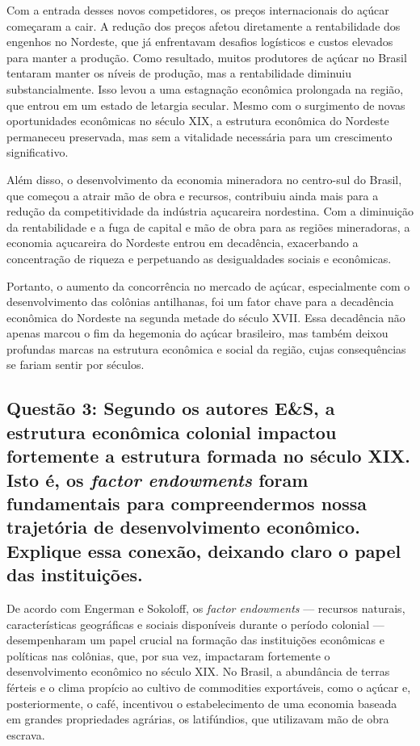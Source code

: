 \documentclass[a4paper,12pt]{article}[abntex2]
\begin{document}
Com a entrada desses novos competidores, os preços internacionais do açúcar começaram a cair. A redução dos preços afetou diretamente a rentabilidade dos engenhos no Nordeste, que já enfrentavam desafios logísticos e custos elevados para manter a produção. Como resultado, muitos produtores de açúcar no Brasil tentaram manter os níveis de produção, mas a rentabilidade diminuiu substancialmente. Isso levou a uma estagnação econômica prolongada na região, que entrou em um estado de letargia secular. Mesmo com o surgimento de novas oportunidades econômicas no século XIX, a estrutura econômica do Nordeste permaneceu preservada, mas sem a vitalidade necessária para um crescimento significativo.

Além disso, o desenvolvimento da economia mineradora no centro-sul do Brasil, que começou a atrair mão de obra e recursos, contribuiu ainda mais para a redução da competitividade da indústria açucareira nordestina. Com a diminuição da rentabilidade e a fuga de capital e mão de obra para as regiões mineradoras, a economia açucareira do Nordeste entrou em decadência, exacerbando a concentração de riqueza e perpetuando as desigualdades sociais e econômicas.

Portanto, o aumento da concorrência no mercado de açúcar, especialmente com o desenvolvimento das colônias antilhanas, foi um fator chave para a decadência econômica do Nordeste na segunda metade do século XVII. Essa decadência não apenas marcou o fim da hegemonia do açúcar brasileiro, mas também deixou profundas marcas na estrutura econômica e social da região, cujas consequências se fariam sentir por séculos.

\subsection{\textbf{Questão 3: Segundo os autores E\&S, a estrutura econômica colonial impactou fortemente a estrutura formada no século XIX. Isto é, os \textit{factor endowments} foram fundamentais para compreendermos nossa trajetória de desenvolvimento econômico. Explique essa conexão, deixando claro o papel das instituições.}}

De acordo com Engerman e Sokoloff, os \textit{factor endowments} — recursos naturais, características geográficas e sociais disponíveis durante o período colonial — desempenharam um papel crucial na formação das instituições econômicas e políticas nas colônias, que, por sua vez, impactaram fortemente o desenvolvimento econômico no século XIX. No Brasil, a abundância de terras férteis e o clima propício ao cultivo de commodities exportáveis, como o açúcar e, posteriormente, o café, incentivou o estabelecimento de uma economia baseada em grandes propriedades agrárias, os latifúndios, que utilizavam mão de obra escrava.
\end{document}
